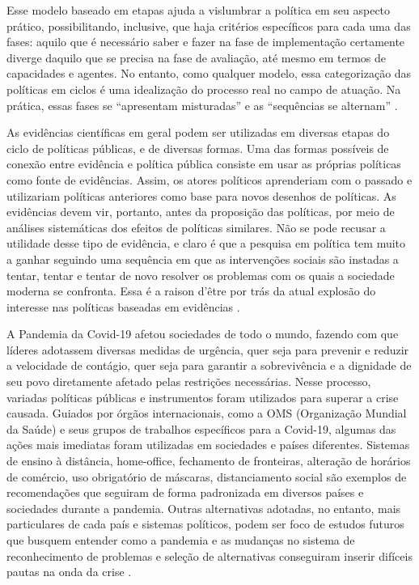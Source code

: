 Esse modelo baseado em etapas ajuda a vislumbrar a política em seu aspecto prático, possibilitando, inclusive, que haja critérios específicos para cada uma das fases: aquilo que é necessário saber e fazer na fase de implementação certamente diverge daquilo que se precisa na fase de avaliação, até mesmo em termos de capacidades e agentes. No entanto, como qualquer modelo, essa categorização das políticas em ciclos é uma idealização do processo real no campo de atuação. Na prática, essas fases se “apresentam misturadas” e as
“sequências se alternam” \cite{de2018politicas}.

As evidências científicas em geral podem ser utilizadas em diversas etapas do ciclo de políticas públicas, e de diversas formas. Uma das formas possíveis de conexão entre evidência e política pública consiste em usar as próprias políticas como fonte de evidências. Assim, os atores políticos aprenderiam com o passado e utilizariam políticas anteriores como base para novos desenhos de políticas. As evidências devem vir, portanto, antes da proposição das políticas, por meio de análises sistemáticas dos efeitos de políticas similares.
Não se pode recusar a utilidade desse tipo de evidência, e claro é que a pesquisa em política tem muito a ganhar seguindo uma sequência em que as intervenções sociais são instadas a tentar, tentar e tentar de novo resolver os problemas com os quais a sociedade moderna se confronta. Essa é a raison d’être por trás da atual explosão do interesse nas políticas baseadas em evidências \cite{de2018politicas}.

A Pandemia da Covid-19 afetou sociedades de todo o mundo, fazendo com que líderes adotassem diversas medidas de urgência, quer seja para prevenir e reduzir a velocidade de contágio, quer seja para garantir a sobrevivência e a dignidade de seu povo diretamente afetado pelas restrições necessárias. Nesse processo, variadas políticas públicas e instrumentos foram utilizados para superar a crise causada. Guiados por órgãos internacionais, como a OMS (Organização Mundial da Saúde) e seus grupos de trabalhos específicos para a Covid-19, algumas das ações mais imediatas foram utilizadas em sociedades e países diferentes. Sistemas de ensino à distância, home-office, fechamento de fronteiras, alteração de horários de comércio, uso obrigatório de máscaras, distanciamento social são exemplos de recomendações que seguiram de forma padronizada em diversos países e sociedades durante a pandemia. Outras alternativas adotadas, no entanto, mais particulares de cada país e sistemas políticos, podem ser foco de estudos futuros que busquem entender como a pandemia e as mudanças no sistema de reconhecimento de problemas e seleção de alternativas conseguiram inserir difíceis pautas na onda da crise \cite{brasil2020estudos}.

